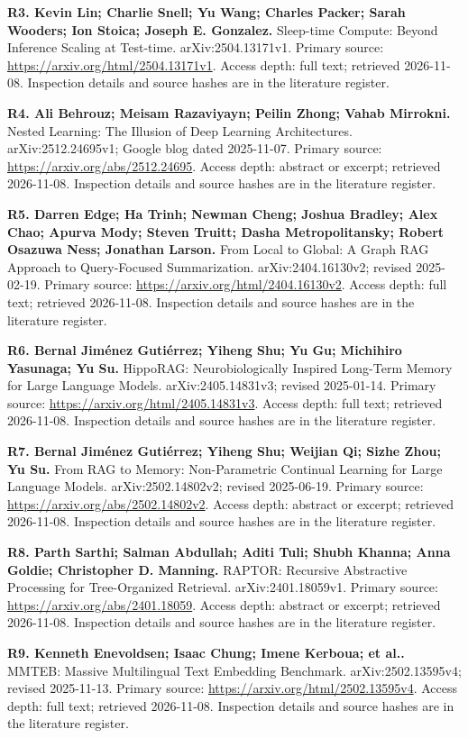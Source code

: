 \documentclass[
  10pt,
]{article}
\begin{document}
\textbf{R3. Kevin Lin; Charlie Snell; Yu Wang; Charles Packer; Sarah
Wooders; Ion Stoica; Joseph E. Gonzalez.} Sleep-time Compute: Beyond
Inference Scaling at Test-time. arXiv:2504.13171v1. Primary source:
\url{https://arxiv.org/html/2504.13171v1}. Access depth: full text;
retrieved 2026-11-08. Inspection details and source hashes are in the
literature register.

\textbf{R4. Ali Behrouz; Meisam Razaviyayn; Peilin Zhong; Vahab
Mirrokni.} Nested Learning: The Illusion of Deep Learning Architectures.
arXiv:2512.24695v1; Google blog dated 2025-11-07. Primary source:
\url{https://arxiv.org/abs/2512.24695}. Access depth: abstract or
excerpt; retrieved 2026-11-08. Inspection details and source hashes are
in the literature register.

\textbf{R5. Darren Edge; Ha Trinh; Newman Cheng; Joshua Bradley; Alex
Chao; Apurva Mody; Steven Truitt; Dasha Metropolitansky; Robert Osazuwa
Ness; Jonathan Larson.} From Local to Global: A Graph RAG Approach to
Query-Focused Summarization. arXiv:2404.16130v2; revised 2025-02-19.
Primary source: \url{https://arxiv.org/html/2404.16130v2}. Access depth:
full text; retrieved 2026-11-08. Inspection details and source hashes
are in the literature register.

\textbf{R6. Bernal Jiménez Gutiérrez; Yiheng Shu; Yu Gu; Michihiro
Yasunaga; Yu Su.} HippoRAG: Neurobiologically Inspired Long-Term Memory
for Large Language Models. arXiv:2405.14831v3; revised 2025-01-14.
Primary source: \url{https://arxiv.org/html/2405.14831v3}. Access depth:
full text; retrieved 2026-11-08. Inspection details and source hashes
are in the literature register.

\textbf{R7. Bernal Jiménez Gutiérrez; Yiheng Shu; Weijian Qi; Sizhe
Zhou; Yu Su.} From RAG to Memory: Non-Parametric Continual Learning for
Large Language Models. arXiv:2502.14802v2; revised 2025-06-19. Primary
source: \url{https://arxiv.org/abs/2502.14802v2}. Access depth: abstract
or excerpt; retrieved 2026-11-08. Inspection details and source hashes
are in the literature register.

\textbf{R8. Parth Sarthi; Salman Abdullah; Aditi Tuli; Shubh Khanna;
Anna Goldie; Christopher D. Manning.} RAPTOR: Recursive Abstractive
Processing for Tree-Organized Retrieval. arXiv:2401.18059v1. Primary
source: \url{https://arxiv.org/abs/2401.18059}. Access depth: abstract
or excerpt; retrieved 2026-11-08. Inspection details and source hashes
are in the literature register.

\textbf{R9. Kenneth Enevoldsen; Isaac Chung; Imene Kerboua; et al..}
MMTEB: Massive Multilingual Text Embedding Benchmark.
arXiv:2502.13595v4; revised 2025-11-13. Primary source:
\url{https://arxiv.org/html/2502.13595v4}. Access depth: full text;
retrieved 2026-11-08. Inspection details and source hashes are in the
literature register.
\end{document}
